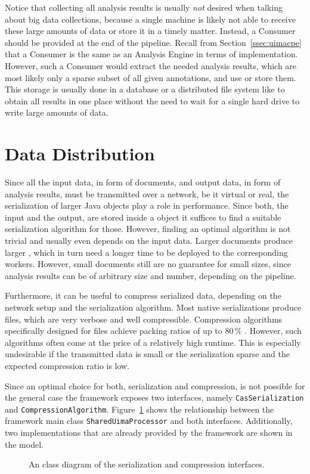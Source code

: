 Notice that collecting all analysis results is usually \emph{not} desired when talking about big data collections, because a single machine is likely not able to receive these large amounts of data or store it in a timely matter. Instead, a \cas{} Consumer should be provided at the end of the pipeline. Recall from Section~\ref{ssec:uimacpe} that a \cas{} Consumer is the same as an Analysis Engine in terms of implementation. However, such a \cas{} Consumer would extract the needed analysis results, which are most likely only a sparse subset of all given annotations, and use or store them. This storage is usually done in a database or a distributed file system like \hdfs{} to obtain all results in one place without the need to wait for a single hard drive to write large amounts of data.

\section{Data Distribution}
\label{sec:distribution}
Since all the input data, in form of documents, and output data, in form of analysis results, must be transmitted over a network, be it virtual or real, the serialization of larger Java objects play a role in performance. Since both, the input and the output, are stored inside a \cas{} object it suffices to find a suitable serialization algorithm for those. However, finding an optimal algorithm is not trivial and usually even depends on the input data. Larger documents produce larger \cas{}, which in turn need a longer time to be deployed to the corresponding \spark{} workers. However, small documents still are no guarantee for small \cas{} sizes, since analysis results can be of arbitrary size and number, depending on the \uima{} pipeline. 

Furthermore, it can be useful to compress serialized data, depending on the network setup and the serialization algorithm. Most native \uima{} serializations produce \xml{} files, which are very verbose and well compressible. Compression algorithms specifically designed for \xml{} files achieve packing ratios of up to 80\,\% \cite{girardot2005system,min2003xpress,sakr2009xml}. However, such algorithms often come at the price of a relatively high runtime. This is especially undesirable if the transmitted data is small or the serialization sparse and the expected compression ratio is low.

Since an optimal choice for both, serialization and compression, is not possible for the general case the framework exposes two interfaces, namely \lstinline|CasSerialization| and \lstinline|CompressionAlgorithm|. Figure~\ref{fig:interfaces} shows the relationship between the framework main class \lstinline|SharedUimaProcessor| and both interfaces. Additionally, two implementations that are already provided by the framework are shown in the model.
\begin{figure}[htb]
	\centering
	\resizebox{\linewidth}{!}{\small}
	\caption[An UML class diagram of the serialization and compression interfaces.]{An \uml{} class diagram of the serialization and compression interfaces.}
	\label{fig:interfaces}
\end{figure}
